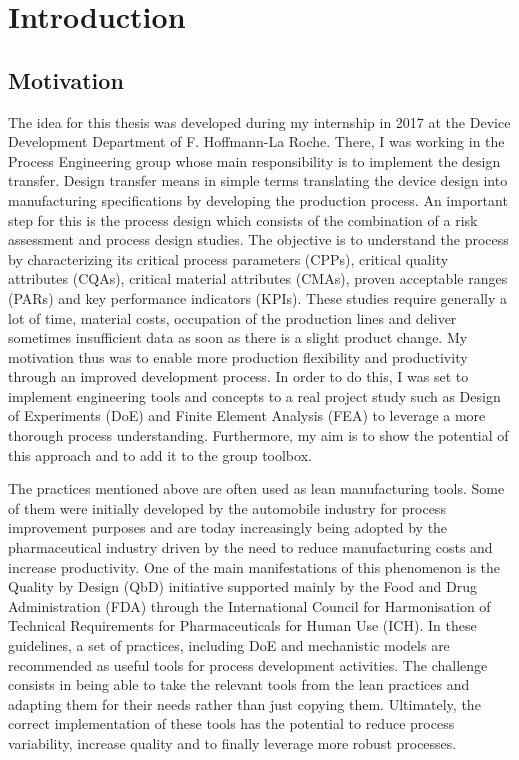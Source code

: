\section{Introduction}
\subsection{Motivation}
The idea for this thesis was developed during my internship in 2017 at the Device Development
Department of F. Hoffmann-La Roche. There, I was working in the Process Engineering group whose main responsibility is to implement the design transfer. Design transfer means in simple terms translating the device design into manufacturing specifications by developing the production process. An important step for this is the process design which consists of the combination of a risk assessment and process design studies. The objective is to understand the process by characterizing its critical process parameters (CPPs), critical quality attributes (CQAs), critical material attributes (CMAs), proven acceptable ranges (PARs) and key performance indicators (KPIs). These studies require generally a lot of time, material costs, occupation of the production lines and deliver sometimes insufficient data as soon as there is a slight product change. My motivation thus was to enable more production flexibility and productivity through an improved development process. In order to do this, I was set to implement engineering tools and concepts to a real project study such as Design of Experiments (DoE) and Finite Element Analysis (FEA) to leverage a more thorough process understanding. Furthermore, my aim is to show the potential of this approach and to add it to the  group toolbox.

The practices mentioned above are often used as lean manufacturing tools. Some of them were initially developed by the automobile industry for process improvement purposes and are today increasingly being adopted by the pharmaceutical industry driven by the need to reduce manufacturing costs and increase productivity. One of the main manifestations of this phenomenon is the Quality by Design (QbD) initiative supported mainly by the Food and Drug Administration (FDA) through the International Council for Harmonisation of Technical Requirements for Pharmaceuticals for Human Use (ICH). 
 In these guidelines, a set of practices, including DoE and mechanistic models are recommended as useful tools for process development activities. The challenge consists in being able to take the relevant tools from the lean practices and adapting them for their needs rather than just copying them.
Ultimately, the correct implementation of these tools has the potential to reduce process variability, increase quality and to finally leverage more robust processes. 


